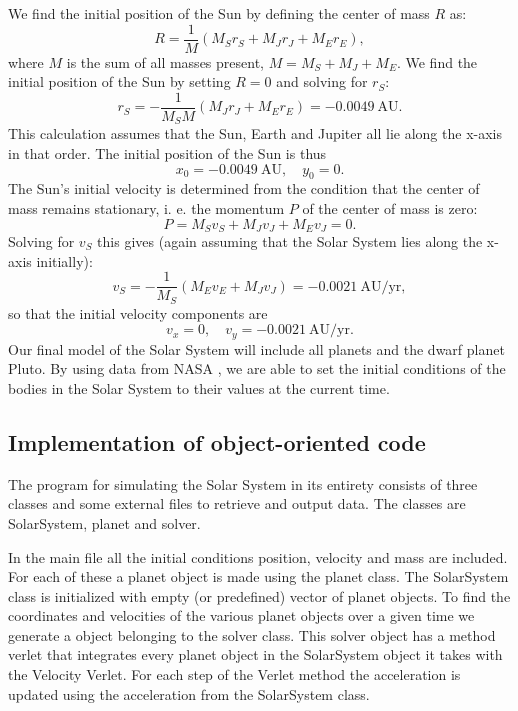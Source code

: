 \documentclass{emulateapj}
\begin{document}
We find the initial position of the Sun by defining the center of mass $R$ as:
%
\begin{equation*}
    R = \frac{1}{M}(M_S r_S + M_J r_J + M_E r_E),
\end{equation*}
%
where $M$ is the sum of all masses present, $M = M_S + M_J + M_E$.
We find the initial position of the Sun by setting $R=0$ and solving for $r_S$:
%
\begin{equation*}
    r_S = - \frac{1}{M_S M}\left( M_J r_J + M_E r_E \right) = -0.0049 \ \textrm{AU}.
\end{equation*}
%
This calculation assumes that the Sun, Earth and Jupiter all lie along the x-axis in that order. The initial position of the Sun is thus
%
\begin{equation*}
    x_0 = -0.0049 \ \textrm{AU}, \quad y_0 = 0.
\end{equation*}
%
The Sun's initial velocity is determined from the condition that the center of mass remains stationary, i. e. the momentum $P$ of the center of mass is zero:
%
\begin{equation*}
    P = M_S v_S + M_J v_J + M_E v_J = 0.
\end{equation*}
%
Solving for $v_S$ this gives (again assuming that the Solar System lies along the x-axis initially):
%
\begin{equation*}
    v_S = -\frac{1}{M_S}\left( M_E v_E + M_J v_J \right) = -0.0021 \ \textrm{AU/yr},
\end{equation*}
%
so that the initial velocity components are 
%
\begin{equation*}
    v_{x} = 0, \quad v_{y} =  -0.0021 \ \textrm{AU/yr}.
\end{equation*}
%
Our final model of the Solar System will include all planets and the dwarf planet Pluto. By using data from NASA \cite{bib:nasa}, we are able to set the initial conditions of the bodies in the Solar System to their values at the current time.

\subsection{Implementation of object-oriented code}
The program for simulating the Solar System in its entirety consists of three classes and some external files to retrieve and output data. The classes are 
SolarSystem, planet and solver.

In the main file all the initial conditions position, velocity and mass are included. For each of these a planet object is made using the planet class.
%
The SolarSystem class is initialized with empty (or predefined) vector of planet objects.
To find the coordinates and velocities of the various planet objects over a given time we generate a object belonging to the solver class. This solver object has a method verlet that integrates every planet object in the SolarSystem object it takes with the Velocity Verlet. For each step of the Verlet method the acceleration is updated using the acceleration from the SolarSystem class. 
\end{document}
